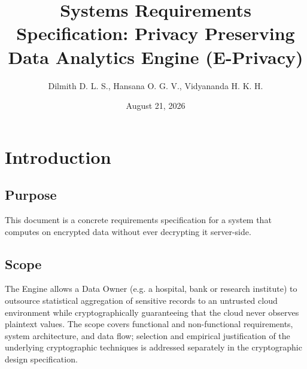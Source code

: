 \documentclass[12pt]{article}
\title{Systems Requirements Specification: Privacy Preserving Data Analytics Engine (E-Privacy)}
\author{Dilmith D. L. S., Hansana O. G. V., Vidyananda H. K. H.}
\date{August 21, 2026}
\begin{document}
\maketitle

\section{Introduction}

\subsection{Purpose}
This document is a concrete requirements specification for a system that computes on encrypted data without ever decrypting it server-side.

\subsection{Scope}
The Engine allows a Data Owner (e.g. a hospital, bank or research institute) to outsource statistical aggregation of sensitive records to an untrusted cloud environment while cryptographically guaranteeing that the cloud never observes plaintext values. The scope covers functional and non-functional requirements, system architecture, and data flow; selection and empirical justification of the underlying cryptographic techniques is addressed separately in the cryptographic design specification.
\end{document}

